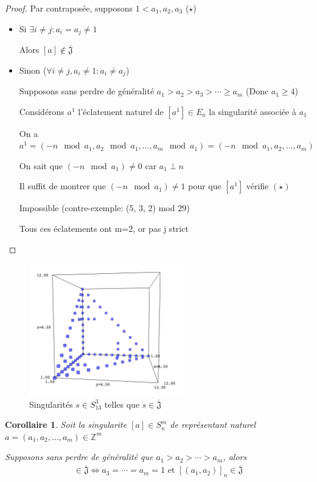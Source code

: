 \documentclass{article}
\newtheorem{corollary}{Corollaire}
\begin{document}
\begin{proof}
    Par contraposée, supposons $1 < a_1, a_2, a_3$ ($\star$)

    \begin{itemize}
        \item Si $\exists i \neq j : a_i = a_j \neq 1$
        
            Alors $[a] \not \in \overline{\mathfrak{J}}$
        \item Sinon ($\forall i \neq j, a_i \neq 1 : a_i \neq a_j$)
        
            Supposons sans perdre de généralité $a_1 > a_2 > a_3 > \cdots \geq a_m$ (Donc $a_1 \geq 4$)

            Considérons $a^1$ l'éclatement naturel de $[a^1] \in E_a$ la singularité associée à $a_1$

            On a $a^1 = (-n \mod {a_1}, a_2 \mod {a_1}, \dots, a_m \mod {a_1}) = (-n \mod {a_1}, a_2, \dots, a_m)$

            On sait que $(-n \mod {a_1}) \neq 0$ car $a_1 \perp n$

            Il suffit de montrer que $(-n \mod {a_1}) \neq 1$ pour que $[a^1]$ vérifie $(\star)$

            Impossible (contre-exemple: (5, 3, 2) mod 29)

            Tous ces éclatements ont m=2, or pas j strict
    \end{itemize}
\end{proof}

\begin{figure}[h]
    \caption{Singularités $s \in S_{13}^3$ telles que $s \in \overline{\mathfrak{J}}$}
    \centering
    \includegraphics[width=0.6\textwidth]{singularite_j_strict_m3_n13}
\end{figure}

\begin{corollary}
    Soit la singularite $[a] \in S_n^m$ de représentant naturel $a = (a_1, a_2, \dots, a_m) \in \mathbb{Z}^m$

    Supposons sans perdre de généralité que $a_1 > a_2 > \cdots > a_m$, alors
    \begin{align*}
        [a] \in \overline{\mathfrak{J}} \iff a_3 = \cdots = a_m = 1 \text{ et } {[(a_1, a_2)]}_n \in \overline{\mathfrak{J}}
    \end{align*}
\end{corollary}
\end{document}
